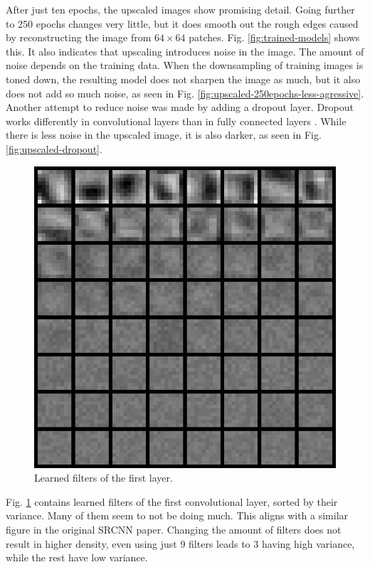 \documentclass[english]{mvi-report}
\begin{document}
\newpage
\noindent
After just ten epochs, the upscaled images show promising detail. Going further to 250 epochs changes very little, but it does smooth out the rough edges caused by reconstructing the image from $64\times64$ patches. Fig. \ref{fig:trained-models} shows this. It also indicates that upscaling introduces noise in the image. The amount of noise depends on the training data. When the downsampling of training images is toned down, the resulting model does not sharpen the image as much, but it also does not add so much noise, as seen in Fig. \ref{fig:upscaled-250epochs-less-agressive}. Another attempt to reduce noise was made by adding a dropout layer. Dropout works differently in convolutional layers than in fully connected layers \cite{Reinhold2019}. While there is less noise in the upscaled image, it is also darker, as seen in Fig. \ref{fig:upscaled-dropout}.

\begin{figure}[htpb]
  \centering
  \includegraphics[width=0.95\linewidth]{media/250epochs-learned-filters.png}
  \caption{Learned filters of the first layer.}
  \label{fig:learned-filters}
\end{figure}

Fig. \ref{fig:learned-filters} contains learned filters of the first convolutional layer, sorted by their variance. Many of them seem to not be doing much. This aligns with a similar figure in the original SRCNN paper. Changing the amount of filters does not result in higher density, even using just 9 filters leads to 3 having high variance, while the rest have low variance.
\end{document}
